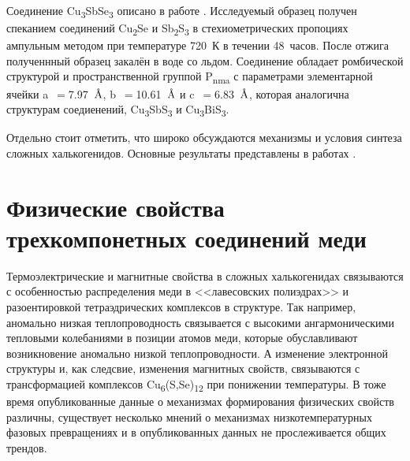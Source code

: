 Соединение Cu\textsubscript{3}SbSe\textsubscript{3} описано в работе \cite{31_Whitfield_1980}. Исследуемый образец получен спеканием соединений Cu\textsubscript{2}Se и Sb\textsubscript{2}S\textsubscript{3} в стехиометрических пропоциях ампульным методом при температуре 720~К в течении 48~часов. После отжига полученнный образец закалён в воде со льдом. Соединение обладает ромбической структурой и пространственной группой P\textsubscript{nma} с параметрами элементарной ячейки a~$=$7.97~$\mbox{\normalfont\AA}$, b~$=$10.61~$\mbox{\normalfont\AA}$ и c~$=$6.83~$\mbox{\normalfont\AA}$, которая аналогична структурам соедиенений,  Cu\textsubscript{3}SbS\textsubscript{3} и  Cu\textsubscript{3}BiS\textsubscript{3}.


Отдельно стоит отметить, что широко обсуждаются механизмы и условия синтеза сложных халькогенидов. Основные результаты представлены в работах \cite{Sis_Frost2002,sis_karup59new,sis_Mueller2002,sis_Mueller2003,sis_Raghavan2004,sis_seal1990tetrahedrite,sis_Skinner1972,sis_Taras_Bryndzia_1988,sis_Tomkins2006,sis1_1347-4065-8-4-443,sis1_BALAZ1995375,sis1_Braga2008,sis1_Pfitzner:se0205,sis1_WELLER2017794}.
\newpage


\section{Физические свойства трехкомпонетных соединений меди} \label{sect1_3}

Термоэлектрические и магнитные свойства в сложных халькогенидах связываются с особенностью распределения меди в <<лавесовских полиэдрах>>  и разоентировкой тетраэдрических комплексов в структуре. Так например, аномально низкая теплопроводность связывается с высокими ангармоническими тепловыми колебаниями в позиции атомов меди\cite{Mishra2017}, которые обуславливают возникновение аномально низкой теплопроводности. А изменение электронной структуры и, как следсвие, изменения магнитных свойств, связываются с трансформацией комплексов  Cu\textsubscript{6}(S,Se)\textsubscript{12} при понижении температуры\cite{Gainov2008}. В тоже время опубликованные данные о механизмах формирования физических свойств различны, существует несколько мнений о механизмах низкотемпературных фазовых превращениях и в опубликованных данных не прослеживается общих трендов.


